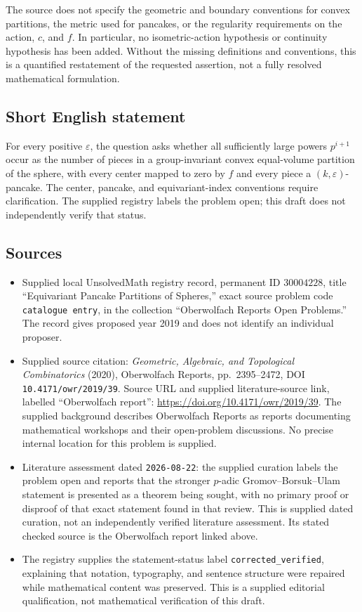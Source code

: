 \documentclass[11pt]{article}
\begin{document}
The source does not specify the geometric and boundary conventions for convex partitions, the metric used for pancakes, or the regularity requirements on the action, \(c\), and \(f\). In particular, no isometric-action hypothesis or continuity hypothesis has been added. Without the missing definitions and conventions, this is a quantified restatement of the requested assertion, not a fully resolved mathematical formulation.
\subsection{Short English statement}
For every positive \(\varepsilon\), the question asks whether all sufficiently large powers \(p^{i+1}\) occur as the number of pieces in a group-invariant convex equal-volume partition of the sphere, with every center mapped to zero by \(f\) and every piece a \((k,\varepsilon)\)-pancake. The center, pancake, and equivariant-index conventions require clarification. The supplied registry labels the problem open; this draft does not independently verify that status.
\subsection{Sources}
\begin{itemize}
\item Supplied local UnsolvedMath registry record, permanent ID \(30004228\), title ``Equivariant Pancake Partitions of Spheres,'' exact source problem code \texttt{catalogue entry}, in the collection ``Oberwolfach Reports Open Problems.'' The record gives proposed year 2019 and does not identify an individual proposer.
\item Supplied source citation: \emph{Geometric, Algebraic, and Topological Combinatorics} (2020), Oberwolfach Reports, pp.\ 2395--2472, DOI \texttt{10.4171/owr/2019/39}. Source URL and supplied literature-source link, labelled ``Oberwolfach report'': \url{https://doi.org/10.4171/owr/2019/39}. The supplied background describes Oberwolfach Reports as reports documenting mathematical workshops and their open-problem discussions. No precise internal location for this problem is supplied.
\item Literature assessment dated \texttt{2026-08-22}: the supplied curation labels the problem open and reports that the stronger \(p\)-adic Gromov--Borsuk--Ulam statement is presented as a theorem being sought, with no primary proof or disproof of that exact statement found in that review. This is supplied dated curation, not an independently verified literature assessment. Its stated checked source is the Oberwolfach report linked above.
\item The registry supplies the statement-status label \texttt{corrected\_verified}, explaining that notation, typography, and sentence structure were repaired while mathematical content was preserved. This is a supplied editorial qualification, not mathematical verification of this draft.
\end{itemize}
\end{document}
